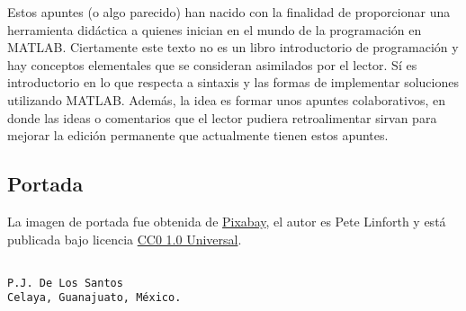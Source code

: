 Estos apuntes (o algo parecido) han nacido con la finalidad de
proporcionar una herramienta didáctica a quienes inician en el mundo de
la programación en MATLAB. Ciertamente este texto no es un libro
introductorio de programación y hay conceptos elementales que se
consideran asimilados por el lector. Sí es introductorio en lo que
respecta a sintaxis y las formas de implementar soluciones utilizando
MATLAB. Además, la idea es formar unos apuntes colaborativos, en donde
las ideas o comentarios que el lector pudiera retroalimentar sirvan para
mejorar la edición permanente que actualmente tienen estos apuntes.

\subsection*{Portada}

La imagen de portada fue obtenida de
\href{https://pixabay.com/es/nano-tecnolog\%C3\%ADa-construcci\%C3\%B3n-1480553/}{Pixabay},
el autor es Pete Linforth y está publicada bajo licencia
\href{https://creativecommons.org/publicdomain/zero/1.0/deed.es}{CC0 1.0
Universal}.


\begin{verbatim}

P.J. De Los Santos
Celaya, Guanajuato, México.
\end{verbatim}

